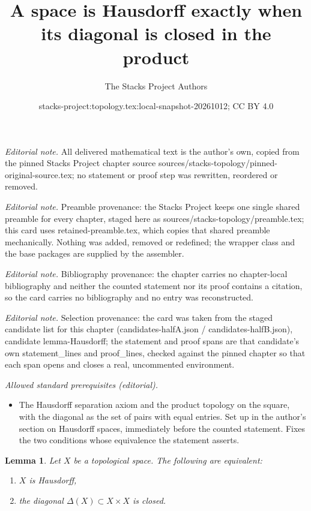\documentclass[10pt,a4paper]{amsart}
\title{A space is Hausdorff exactly when its diagonal is closed in the product}
\author{The Stacks Project Authors}
\date{stacks-project:topology.tex:local-snapshot-20261012; CC BY 4.0}
\theoremstyle{plain}
\newtheorem{lemma}[subsection]{Lemma}
\theoremstyle{definition}
\theoremstyle{remark}
\numberwithin{equation}{subsection}
\begin{document}
\maketitle
\noindent\textit{Editorial note.} All delivered mathematical text is the author's own, copied from the pinned Stacks Project chapter source sources/stacks-topology/pinned-original-source.tex; no statement or proof step was rewritten, reordered or removed.\par\medskip
\noindent\textit{Editorial note.} Preamble provenance: the Stacks Project keeps one single shared preamble for every chapter, staged here as sources/stacks-topology/preamble.tex; this card uses retained-preamble.tex, which copies that shared preamble mechanically. Nothing was added, removed or redefined; the wrapper class and the base packages are supplied by the assembler.\par\medskip
\noindent\textit{Editorial note.} Bibliography provenance: the chapter carries no chapter-local bibliography and neither the counted statement nor its proof contains a citation, so the card carries no bibliography and no entry was reconstructed.\par\medskip
\noindent\textit{Editorial note.} Selection provenance: the card was taken from the staged candidate list for this chapter (candidates-halfA.json / candidates-halfB.json), candidate lemma-Hausdorff; the statement and proof spans are that candidate's own statement\_lines and proof\_lines, checked against the pinned chapter so that each span opens and closes a real, uncommented environment.\par\medskip
\noindent\textit{Allowed standard prerequisites (editorial).}\begin{itemize}
\item The Hausdorff separation axiom and the product topology on the square, with the diagonal as the set of pairs with equal entries. Set up in the author's section on Hausdorff spaces, immediately before the counted statement. Fixes the two conditions whose equivalence the statement asserts.
\end{itemize}\medskip
\begin{lemma}
\label{lemma-Hausdorff}
Let $X$ be a topological space. The following are equivalent:
\begin{enumerate}
\item $X$ is Hausdorff,
\item the diagonal $\Delta(X) \subset X \times X$ is closed.
\end{enumerate}
\end{lemma}
\end{document}
